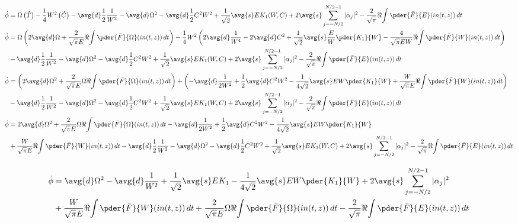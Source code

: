 \begin{itemize}
\begin{equation}
\begin{split}
\dot{\phi} &=  \Omega \left(\dot{T} \right) - \frac{1}{4} W^2 \left(\dot{C}\right) - \avg{d} \frac{1}{2} \frac{1}{W^2} - \avg{d}\Omega^2 - \avg{d}\frac{1}{2} C^2 W^2+ \frac{1}{\sqrt{2}} \avg{s} E K_1(W,C) + 2\avg{s}  \sum_{j=-N/2}^{N/2 - 1} |\alpha_j|^2 - \frac{2}{\sqrt{\pi}}\Re{\int \pder{\bar{F}}{E} (in(t,z))\,dt} \\
\dot{\phi} &=  \Omega \left(2\avg{d} \Omega + \frac{2}{\sqrt{\pi} E}\Re{\int \pder{\bar{F}}{\Omega} (in(t,z))\,dt} \right) - \frac{1}{4} W^2 \left(2 \avg{d} \frac{1}{W^4}  - 2 \avg{d} C^2 + \frac{1}{\sqrt{2}}\avg{s} \frac{E}{W} \pder{K_1}{W} - \frac{4}{\sqrt{\pi}EW}\Re{\int \pder{\bar{F}}{W} (in(t,z))\,dt} \right) \\
&- \avg{d} \frac{1}{2} \frac{1}{W^2} - \avg{d}\Omega^2 - \avg{d}\frac{1}{2} C^2 W^2+ \frac{1}{\sqrt{2}} \avg{s} E K_1(W,C) + 2\avg{s}  \sum_{j=-N/2}^{N/2 - 1} |\alpha_j|^2 - \frac{2}{\sqrt{\pi}}\Re{\int \pder{\bar{F}}{E} (in(t,z))\,dt} \\
\dot{\phi} &=  \left(2\avg{d} \Omega^2 + \frac{2}{\sqrt{\pi} E}\Omega\Re{\int \pder{\bar{F}}{\Omega} (in(t,z))\,dt} \right) + \left( - \avg{d} \frac{1}{2W^2}  + \frac{1}{2}\avg{d} C^2W^2 - \frac{1}{4\sqrt{2}}\avg{s} EW \pder{K_1}{W} + \frac{W}{\sqrt{\pi}E}\Re{\int \pder{\bar{F}}{W} (in(t,z))\,dt} \right) \\
&- \avg{d} \frac{1}{2} \frac{1}{W^2} - \avg{d}\Omega^2 - \avg{d}\frac{1}{2} C^2 W^2+ \frac{1}{\sqrt{2}} \avg{s} E K_1(W,C) + 2\avg{s}  \sum_{j=-N/2}^{N/2 - 1} |\alpha_j|^2 - \frac{2}{\sqrt{\pi}}\Re{\int \pder{\bar{F}}{E} (in(t,z))\,dt} \\
\dot{\phi} &= 2\avg{d} \Omega^2  + \frac{2}{\sqrt{\pi} E} \Omega \Re{\int \pder{\bar{F}}{\Omega} (in(t,z))\,dt}- \avg{d} \frac{1}{2W^2}  + \frac{1}{2}\avg{d} C^2W^2 - \frac{1}{4\sqrt{2}} \avg{s} EW \pder{K_1}{W}  \\
&+ \frac{W}{\sqrt{\pi}E}\Re{\int \pder{\bar{F}}{W} (in(t,z))\,dt} - \avg{d} \frac{1}{2} \frac{1}{W^2} - \avg{d}\Omega^2 - \avg{d}\frac{1}{2} C^2 W^2+ \frac{1}{\sqrt{2}} \avg{s} E K_1(W,C) + 2\avg{s}  \sum_{j=-N/2}^{N/2 - 1} |\alpha_j|^2 - \frac{2}{\sqrt{\pi}}\Re{\int \pder{\bar{F}}{E} (in(t,z))\,dt}\\
\end{split}
\end{equation}

\begin{equation}
\begin{split}
\dot{\phi} &= \avg{d} \Omega^2 - \avg{d} \frac{1}{W^2} + \frac{1}{\sqrt{2}} \avg{s} E K_1 - \frac{1}{4\sqrt{2}} \avg{s} EW \pder{K_1}{W} + 2\avg{s}  \sum_{j=-N/2}^{N/2 - 1} |\alpha_j|^2\\
&+ \frac{W}{\sqrt{\pi}E}\Re{\int \pder{\bar{F}}{W} (in(t,z))\,dt} + \frac{2}{\sqrt{\pi} E}\Omega\Re{\int \pder{\bar{F}}{\Omega} (in(t,z))\,dt} - \frac{2}{\sqrt{\pi}}\Re{\int \pder{\bar{F}}{E} (in(t,z))\,dt} \\
\end{split}
\end{equation}

\end{itemize}
% 

